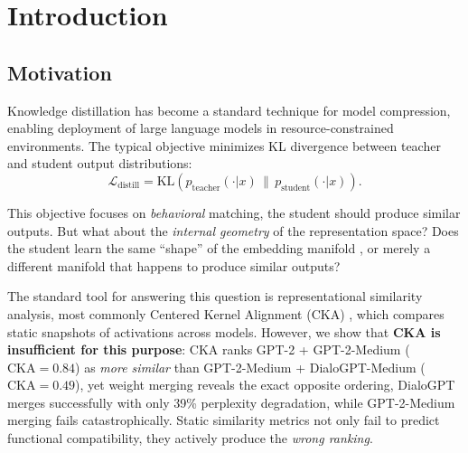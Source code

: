 \documentclass[10pt]{article} %
\theoremstyle{plain}
\theoremstyle{definition}
\theoremstyle{remark}
\begin{document}
\section{Introduction}

\subsection{Motivation}

Knowledge distillation \citep{hinton2015distilling,gou2021knowledge} has become a standard technique for model compression, enabling deployment of large language models in resource-constrained environments. The typical objective minimizes KL divergence between teacher and student output distributions:
\begin{equation}
    \mathcal{L}_{\text{distill}} = \text{KL}\left(p_{\text{teacher}}(\cdot | x) \,\|\, p_{\text{student}}(\cdot | x)\right).
\end{equation}

This objective focuses on \textit{behavioral} matching, the student should produce similar outputs. But what about the \textit{internal geometry} of the representation space? Does the student learn the same ``shape'' of the embedding manifold \citep{li2019deepgkd}, or merely a different manifold that happens to produce similar outputs?

The standard tool for answering this question is representational similarity analysis, most commonly Centered Kernel Alignment (CKA) \citep{kornblith2019similarity}, which compares static snapshots of activations across models. However, we show that \textbf{CKA is insufficient for this purpose}: CKA ranks GPT-2 + GPT-2-Medium ($\text{CKA} = 0.84$) as \textit{more similar} than GPT-2-Medium + DialoGPT-Medium ($\text{CKA} = 0.49$), yet weight merging reveals the exact opposite ordering, DialoGPT merges successfully with only 39\% perplexity degradation, while GPT-2-Medium merging fails catastrophically. Static similarity metrics not only fail to predict functional compatibility, they actively produce the \textit{wrong ranking}.
\end{document}
